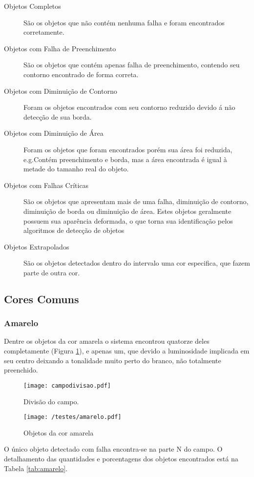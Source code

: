 \begin{description}
	\item[Objetos Completos] São os objetos que não contém nenhuma falha e foram encontrados corretamente.
		\item[Objetos com Falha de Preenchimento] São os objetos que contém apenas falha de preenchimento, contendo seu contorno encontrado de forma correta.
			\item[Objetos com Diminuição de Contorno] Foram os objetos encontrados com seu contorno reduzido devido á não detecção de sua borda.
				\item[Objetos com Diminuição de Área] Foram os objetos que foram encontrados porém sua área foi reduzida, e.g.Contém preenchimento e borda, mas a área encontrada é igual à metade do tamanho real do objeto.
					\item[Objetos com Falhas Críticas] São os objetos que apresentam mais de uma falha, diminuição de contorno, diminuição de borda ou diminuição de área. Estes objetos geralmente possuem sua aparência deformada, o que torna sua identificação pelos algoritmos de detecção de objetos
						\item[Objetos Extrapolados] São os objetos detectados dentro do intervalo uma cor especifica, que fazem parte de outra cor.
\end{description} 
\newpage
\subsection{Cores Comuns}
\subsubsection{Amarelo}	
	Dentre os objetos da cor amarela o sistema encontrou quatorze deles completamente (Figura \ref{fig:amarelo}), e apenas um, que devido a luminosidade implicada em seu centro deixando a tonalidade muito perto do branco, não totalmente preenchido. 
		\begin{figure}[H]
			\begin{minipage}[b]{0.45\linewidth}
				\centering
				\texttt{[image: campodivisao.pdf]}
				\caption{Divisão do campo.}				
			\end{minipage}
			\hspace{0.5cm}
			\begin{minipage}[b]{0.45\linewidth}
				\centering
				\texttt{[image: /testes/amarelo.pdf]}
				\caption{Objetos da cor amarela}
				\label{fig:amarelo}
			\end{minipage}
		\end{figure}
	O único objeto detectado com falha encontra-se na parte N do campo.
	O detalhamento das quantidades e porcentagens dos objetos encontrados está na Tabela \ref{tab:amarelo}.
	
